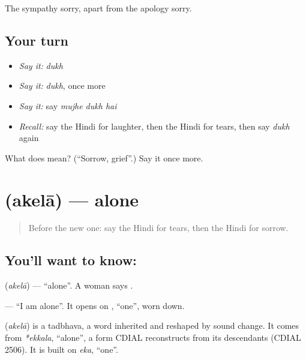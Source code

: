\begin{grammarlens}[title={What you've built}]
The sympathy sorry, apart from the apology sorry.
\end{grammarlens}

\subsection*{Your turn}
\begin{itemize}
\raggedright
  \item \emph{Say it:} \emph{dukh}
  \item \emph{Say it:} \emph{dukh}, once more
  \item \emph{Say it:} say \emph{mujhe dukh hai}
  \item \emph{Recall:} say the Hindi for laughter, then the Hindi for tears, then say \emph{dukh} again
\end{itemize}

\begin{tcolorbox}[breakable,colback=teal!4,colframe=teal!35!black,title={Before you move on}]
What does  mean? (\textquotedblleft{}Sorrow, grief\textquotedblright{}.) Say it once more.
\end{tcolorbox}
\section[\texorpdfstring{\hi{अकेला} (akelā)}{अकेला (akelā)}]{ (akelā) — alone}

\label{lesson:HI-C109-akela}



\begin{quote}
Before the new one: say the Hindi for tears, then the Hindi for sorrow.
\end{quote}

\subsection*{You'll want to know: }
\textbf{} (\emph{akelā}) — \textquotedblleft{}alone\textquotedblright{}. A woman says \textbf{}.

\textbf{  } — \textquotedblleft{}I am alone\textquotedblright{}. It opens on \textbf{}, \textquotedblleft{}one\textquotedblright{}, worn down.

\begin{cousinweb}
\textbf{} (\emph{akelā}) is a tadbhava, a word inherited and reshaped by sound change. It comes from \emph{*ekkala}, \textquotedblleft{}alone\textquotedblright{}, a form CDIAL reconstructs from its descendants (CDIAL 2506). It is built on \emph{eka}, \textquotedblleft{}one\textquotedblright{}.
\end{cousinweb}

